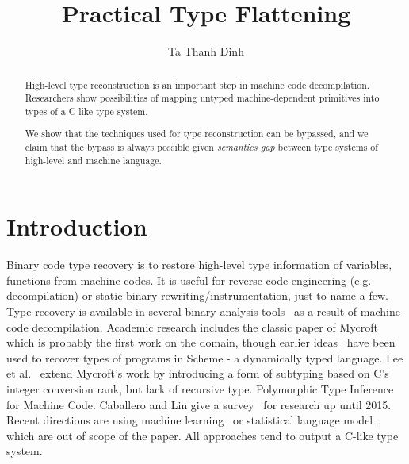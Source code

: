 \documentclass[a4paper]{llncs}
\begin{document}
%
\title{Practical Type Flattening}
%
%
\author{Ta Thanh Dinh}
%
%
%
\maketitle              %
%
\begin{abstract}
High-level type reconstruction is an important step in machine code decompilation.
Researchers show possibilities of mapping untyped machine-dependent
primitives into types of a C-like type system.


We show that the techniques used for type reconstruction can be bypassed,
and we claim that the bypass is always possible given \emph{semantics gap} between
type systems of high-level and machine language.
\end{abstract}
%
%
%
\section{Introduction}
Binary code type recovery is to restore high-level type information of variables,
functions from machine codes. It is useful for reverse code engineering (e.g.
decompilation) or static binary rewriting/instrumentation, just to name a few.
Type recovery is available in several binary analysis
tools~\cite{noauthor_hex-rays_nodate, noauthor_jeb_nodate, noauthor_ghidra_nodate}
as a result of machine code decompilation. Academic research includes the classic
paper of Mycroft~\cite{mycroft_type-based_1999} which is probably the first work
on the domain, though earlier ideas~\cite{shivers_data-flow_1990} have been used
to recover types of programs in Scheme - a dynamically typed language.
Lee et al.~\cite{lee_tie_2011} extend Mycroft's work by introducing a form of
subtyping based on C's integer conversion rank, but lack of recursive type.
Polymorphic Type Inference for Machine Code.
Caballero and Lin give a survey~\cite{caballero_type_2016} for research up until 2015.
Recent directions are using machine learning~\cite{maier_typeminer_2019} or statistical
language model~\cite{katz_estimating_2016}, which are out of scope of the paper.
All approaches tend to output a C-like type system.
\end{document}
